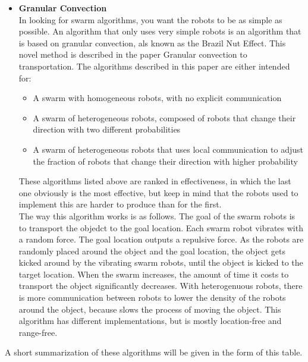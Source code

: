 \begin{itemize}
\item \textbf{Granular Convection}\\
In looking for swarm algorithms, you want the robots to be as simple as possible. An algorithm that only uses very simple robots is an algorithm that is based on granular convection, als known as the Brazil Nut Effect. This novel method is described in the paper Granular convection to transportation.\cite{Sugawara2012} The algorithms described in this paper are either intended for:

\begin{itemize}
  \item A swarm with homogeneous robots, with no explicit communication
  \item A swarm of heterogeneous robots, composed of robots that change their direction with two different probabilities
  \item A swarm of heterogeneous robots that uses local communication to adjust the fraction of robots that change their direction with higher probability
\end{itemize}

These algorithms listed above are ranked in effectiveness, in which the last one obviously is the most effective, but keep in mind that the robots used to implement this are harder to produce than for the first. \\ The way this algorithm works is as follows. The goal of the swarm robots is to transport the objedct to the goal location. Each swarm robot vibrates with a random force. The goal location outputs a repulsive force. As the robots are randomly placed around the object and the goal location, the object gets kicked around by the vibrating swarm robots, until the object is kicked to the target location. When the swarm increases, the amount of time it costs to transport the object significantly decreases. With heterogenuous robots, there is more communication between robots to lower the density of the robots around the object, because slows the process of moving the object.  This algorithm has different implementations, but is mostly location-free and  range-free. 
\end{itemize}

A short summarization of these algorithms will be given in the form of this table. 

